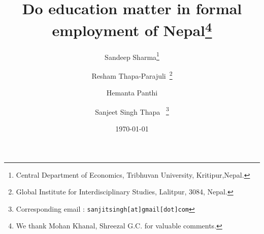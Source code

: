\begin{titlepage}
\title{\vspace{-2.0cm}Do education matter in formal employment of Nepal\footnote{We thank Mohan Khanal, Shreezal G.C. for valuable comments.}
}
\author{Sandeep Sharma\thanks{Central Department of Economics, Tribhuvan University, Kritipur,Nepal.} \and   Resham  Thapa-Parajuli\footnotemark[2]~\footnote{Global Institute for Interdisciplinary Studies, Lalitpur, 3084, Nepal.} \and Hemanta Panthi\footnotemark[2]  \and Sanjeet Singh Thapa \footnotemark[2]~\thanks{Corresponding email : \texttt{sanjitsingh[at]gmail[dot]com}
 }}
\date{\today}
\maketitle

\thispagestyle{empty}
\end{titlepage}
\pagebreak 
